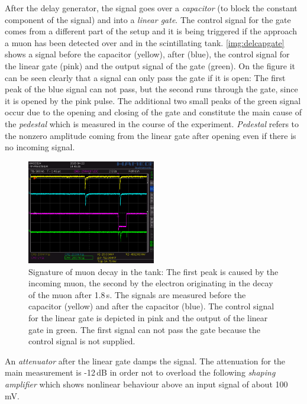 After the delay generator, the signal goes over a \emph{capacitor} (to block the constant component of the signal)
and into a \emph{linear gate}.
The control signal for the gate comes from a different part of the setup and it is being triggered
if the approach a muon has been detected over and in the scintillating tank.
\autoref{img:delcapgate} shows a signal before the capacitor (yellow), after (blue),
the control signal for the linear gate (pink) and the output signal of the gate (green).
On the figure it can be seen clearly that a signal can only pass the gate if it is open:
The first peak of the blue signal can not pass, but the second runs through the gate,
since it is opened by the pink pulse.
The additional two small peaks of the green signal occur due to the opening and closing of the gate
and constitute the main cause of the \emph{pedestal} which is measured in the course of the experiment.
\emph{Pedestal} refers to the nonzero amplitude coming from the linear gate after opening
even if there is no incoming signal.

\begin{figure}[H]
\begin{center}
  \includegraphics[width=0.5\textwidth]{../img/S0014.PNG}
  \caption{Signature of muon decay in the tank: The first peak is caused by the incoming muon,
  the second by the electron originating in the decay of the muon after 1.8\,\textmu s.
  The signals are measured before the capacitor (yellow) and after the capacitor (blue).
  The control signal for the linear gate is depicted in pink and the output of the linear gate in green.
  The first signal can not pass the gate because the control signal is not supplied.}
  \label{img:delcapgate}
\end{center}
\end{figure}

An \emph{attenuator} after the linear gate damps the signal.
The attenuation for the main measurement is -12\,dB in order not to overload the following \emph{shaping amplifier}
which shows nonlinear behaviour above an input signal of about 100\,mV.

